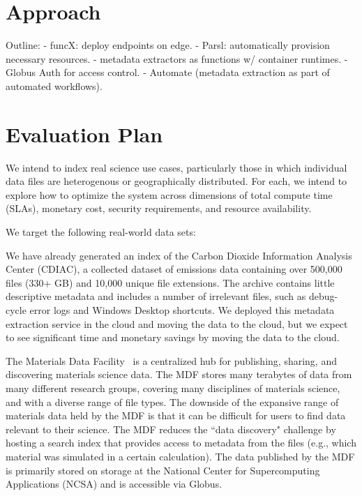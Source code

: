 \documentclass[sigconf]{acmart}
\begin{document}
\section{Approach}
\label{sec:approach}
Outline: 
- funcX: deploy endpoints on edge. 
     - Parsl: automatically provision necessary resources. 
- metadata extractors as functions w/ container runtimes. 
- Globus Auth for access control. 
- Automate (metadata extraction as part of automated workflows). 

\section{Evaluation Plan}
\label{sec:eval}

We intend to index real science use cases, particularly those in which individual data files are heterogenous 
or geographically distributed. For each, we intend to explore how to optimize the system across dimensions of 
total compute time (SLAs), monetary cost, security requirements, and resource availability.

We target the following real-world data sets: 

We have already generated an index of the Carbon Dioxide Information Analysis Center (CDIAC), a collected dataset of 
emissions data containing over 500,000 files (330+ GB) and 10,000 unique file extensions. The archive contains little 
descriptive metadata and includes a number of irrelevant files, such as debug-cycle error logs and Windows Desktop 
shortcuts.  We deployed this metadata extraction service in the cloud and moving the data to the cloud, but we expect 
to see significant time and monetary savings by moving the data to the cloud.  

The Materials Data Facility~\cite{blaiszik2016materials, blaiszik2019mdf}
is a centralized hub for publishing, sharing, and discovering materials science data. 
The MDF stores many terabytes of data from many different research groups, covering many disciplines of 
materials science, and with a diverse range of file types.
The downside of the expansive range of materials data held by the MDF 
is that it can be difficult for users to find data relevant to their science.
The MDF reduces the ``data discovery" challenge by hosting a search index that provides access to metadata from the 
files (e.g., which material was simulated in a certain calculation).
The data published by the MDF is primarily stored on storage at the National Center for Supercomputing Applications
(NCSA) and is accessible via Globus.  
\end{document}
